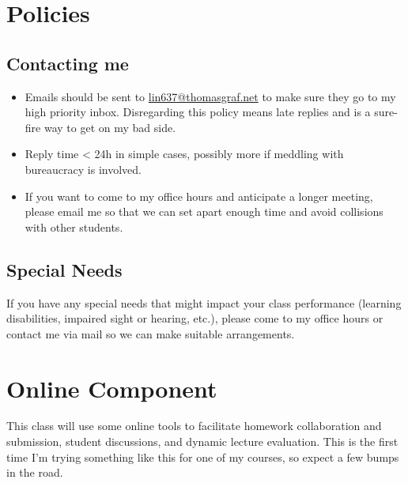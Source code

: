 \section{Policies}

\subsection{Contacting me}
\begin{itemize}
    \item Emails should be sent to \href{mailto://lin637@thomasgraf.net}{lin637@thomasgraf.net} to make sure they go to my high priority inbox.
        Disregarding this policy means late replies and is a sure-fire way to get on my bad side.
    \item Reply time < 24h in simple cases, possibly more if meddling with bureaucracy is involved.
    \item If you want to come to my office hours and anticipate a longer meeting, please email me so that we can set apart enough time and avoid collisions with other students.
\end{itemize}

\subsection{Special Needs}
If you have any special needs that might impact your class performance (learning disabilities, impaired sight or hearing, etc.), please come to my office hours or contact me via mail so we can make suitable arrangements.


\section{Online Component}

This class will use some online tools to facilitate homework collaboration and submission, student discussions, and dynamic lecture evaluation.
This is the first time I'm trying something like this for one of my courses, so expect a few bumps in the road.

